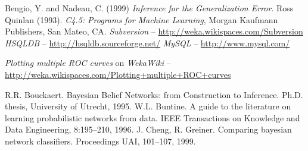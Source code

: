 \begin{thebibliography}{999}
		Bengio, Y. and Nadeau, C. (1999) \textit{Inference for the Generalization Error}.
		Ross Quinlan (1993). \textit{C4.5: Programs for Machine Learning}, Morgan Kaufmann Publishers, San Mateo, CA.
		\textit{Subversion} -- \url{http://weka.wikispaces.com/Subversion}{}
		\textit{HSQLDB} -- \url{http://hsqldb.sourceforge.net/}{}
		\textit{MySQL} -- \url{http://www.mysql.com/}{}

		\textit{Plotting multiple ROC curves} on \textit{WekaWiki} -- \\
		\small{\url{http://weka.wikispaces.com/Plotting+multiple+ROC+curves}{}}

		R.R. Bouckaert. Bayesian Belief Networks: from Construction to Inference. 
		Ph.D. thesis, 
		University of Utrecht, 
		1995.
		W.L. Buntine. A guide to the literature on learning probabilistic networks from data.
		IEEE Transactions on Knowledge and Data Engineering, 8:195--210, 
		1996. 
		J. Cheng, R. Greiner. 
		Comparing bayesian network classifiers. 
		Proceedings UAI,
		101--107,
		1999.

    \newpage


\end{thebibliography}
